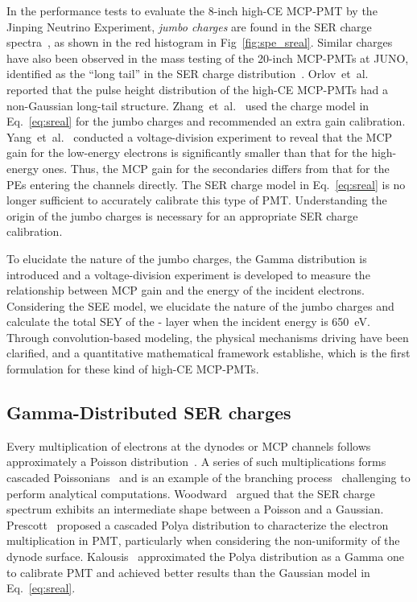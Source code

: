 In the performance tests to evaluate the 8-inch high-CE MCP-PMT by the Jinping Neutrino Experiment,
\emph{jumbo charges} are found in the SER charge spectra~\cite{Zhang:2023ued},
as shown in the red histogram in Fig~\ref{fig:spe_sreal}.
Similar charges have also been observed in the mass testing of the 20-inch MCP-PMTs at JUNO,
identified as the ``long tail'' in the SER charge distribution~\cite{JUNO:2022hlz}.
Orlov~et~al.~\cite{reviewer1} reported that the pulse height distribution of the high-CE MCP-PMTs had a non-Gaussian long-tail structure.
Zhang~et~al.~\cite{2021Gain} used the charge model in Eq.~\eqref{eq:sreal} for the jumbo charges and recommended an extra gain calibration.
Yang~et~al.~\cite{2017MCP} conducted a voltage-division experiment to reveal that the MCP gain for the low-energy electrons is significantly smaller than
that for the high-energy ones.
Thus, the MCP gain for the secondaries differs from that for the PEs entering the channels directly.
The SER charge model in Eq.~\eqref{eq:sreal} is no longer sufficient to accurately calibrate this type of PMT.
Understanding the origin of the jumbo charges is necessary for an appropriate SER charge calibration.


To elucidate the nature of the jumbo charges, the Gamma distribution is introduced and a voltage-division experiment is developed to measure the relationship
between MCP gain and the energy of the incident electrons.
Considering the SEE model, we elucidate the nature of the jumbo charges
and calculate the total SEY of the - layer when the incident energy is \SI{650}{eV}.
Through convolution-based modeling, the physical mechanisms driving have been clarified, and a quantitative mathematical framework establishe, which is the first formulation for these kind of high-CE MCP-PMTs.

\subsection{Gamma-Distributed SER charges}\label{gammapossion}
Every multiplication of electrons at the dynodes or MCP channels follows approximately a Poisson distribution~\cite{branchandPoisson}.
A series of such multiplications forms cascaded Poissonians~\cite{1955Scintillation} and is
an example of the branching process~\cite{Bartlett1963TheTO} challenging to perform analytical computations.
Woodward~\cite{Woodward} argued that the SER charge spectrum exhibits an intermediate shape between a Poisson and a Gaussian.
Prescott~\cite{polya} proposed a cascaded Polya distribution to characterize the electron multiplication in PMT,
particularly when considering the non-uniformity of the dynode surface.
Kalousis~\cite{2012Calibration,2020A} approximated the Polya distribution as a Gamma one to calibrate PMT
and achieved better results than the Gaussian model in Eq.~\eqref{eq:sreal}.


